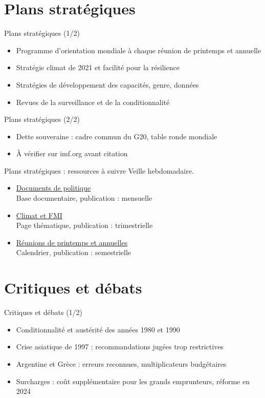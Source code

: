 \documentclass[aspectratio=169,11pt]{beamer}
\begin{document}
\section{Plans stratégiques}
\begin{frame}{Plans stratégiques (1/2)}
\begin{itemize}
\item Programme d'orientation mondiale à chaque réunion de printemps et annuelle
\item Stratégie climat de 2021 et facilité pour la résilience
\item Stratégies de développement des capacités, genre, données
\item Revues de la surveillance et de la conditionnalité
\end{itemize}
\end{frame}

\begin{frame}{Plans stratégiques (2/2)}
\begin{itemize}
\item Dette souveraine : cadre commun du G20, table ronde mondiale
\item À vérifier sur imf.org avant citation
\end{itemize}
\end{frame}

\begin{frame}{Plans stratégiques : ressources à suivre}
\small
Veille hebdomadaire.
\begin{itemize}
\item \href{https://www.imf.org/en/Publications/Policy-Papers}{Documents de politique}\\{\footnotesize Base documentaire, publication : mensuelle}
\item \href{https://www.imf.org/en/Topics/climate-change}{Climat et FMI}\\{\footnotesize Page thématique, publication : trimestrielle}
\item \href{https://www.imf.org/en/Meetings}{Réunions de printemps et annuelles}\\{\footnotesize Calendrier, publication : semestrielle}
\end{itemize}
\end{frame}

\section{Critiques et débats}
\begin{frame}{Critiques et débats (1/2)}
\begin{itemize}
\item Conditionnalité et austérité des années 1980 et 1990
\item Crise asiatique de 1997 : recommandations jugées trop restrictives
\item Argentine et Grèce : erreurs reconnues, multiplicateurs budgétaires
\item Surcharges : coût supplémentaire pour les grands emprunteurs, réforme en 2024
\end{itemize}
\end{frame}
\end{document}
